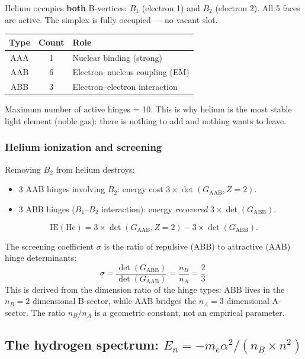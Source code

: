 \documentclass[12pt]{article}
\theoremstyle{remark}
\theoremstyle{definition}
\begin{document}
Helium occupies \textbf{both} B-vertices: $B_1$ (electron 1) and $B_2$ (electron 2). All 5 faces are active. The simplex is fully occupied --- no vacant slot.

\begin{center}
\begin{tabular}{ccl}
\hline
Type & Count & Role \\
\hline
AAA & 1 & Nuclear binding (strong) \\
AAB & 6 & Electron--nucleus coupling (EM) \\
ABB & 3 & Electron--electron interaction \\
\hline
\end{tabular}
\end{center}

Maximum number of active hinges = 10. This is why helium is the most stable light element (noble gas): there is nothing to add and nothing wants to leave.

\subsubsection{Helium ionization and screening}

Removing $B_2$ from helium destroys:
\begin{itemize}
\item 3 AAB hinges involving $B_2$: energy cost $3 \times \det(G_{\text{AAB}}, Z\!=\!2)$.
\item 3 ABB hinges ($B_1$--$B_2$ interaction): energy \emph{recovered} $3 \times \det(G_{\text{ABB}})$.
\end{itemize}

\begin{equation}
\text{IE}(\text{He}) = 3 \times \det(G_{\text{AAB}}, Z\!=\!2) - 3 \times \det(G_{\text{ABB}}).
\end{equation}

The screening coefficient $\sigma$ is the ratio of repulsive (ABB) to attractive (AAB) hinge determinants:
\begin{equation}
\boxed{\sigma = \frac{\det(G_{\text{ABB}})}{\det(G_{\text{AAB}})} = \frac{n_B}{n_A} = \frac{2}{3}.}
\end{equation}
This is derived from the dimension ratio of the hinge types: ABB lives in the $n_B = 2$ dimensional B-sector, while AAB bridges the $n_A = 3$ dimensional A-sector. The ratio $n_B/n_A$ is a geometric constant, not an empirical parameter.

\subsection{The hydrogen spectrum: $E_n = -m_e\alpha^2/(n_B \times n^2)$}
\end{document}
